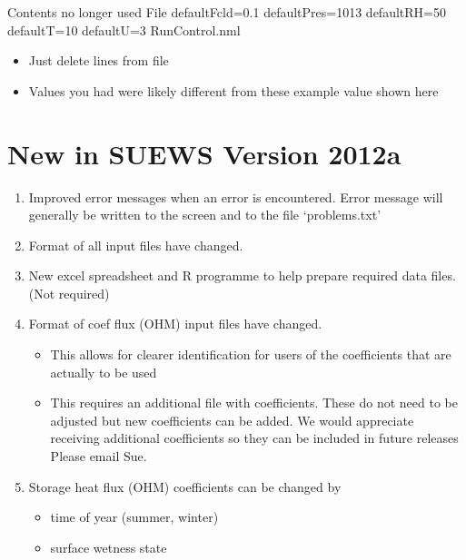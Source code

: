 \documentclass[letterpaper,10pt,english]{sphinxmanual}
\begin{document}
Contents no longer used File defaultFcld=0.1 defaultPres=1013
defaultRH=50 defaultT=10 defaultU=3 RunControl.nml
\begin{itemize}
\item {} 
Just delete lines from file

\item {} 
Values you had were likely different from these example value shown
here

\end{itemize}


\section{New in SUEWS Version 2012a}
\label{\detokenize{version-history:new-in-suews-version-2012a}}\begin{enumerate}
\item {} 
Improved error messages when an error is encountered. Error message
will generally be written to the screen and to the file
‘problems.txt’

\item {} 
Format of all input files have changed.

\item {} 
New excel spreadsheet and R programme to help prepare required data
files. (Not required)

\item {} 
Format of coef flux (OHM) input files have changed.
\begin{itemize}
\item {} 
This allows for clearer identification for users of the
coefficients that are actually to be used

\item {} 
This requires an additional file with coefficients. These do not
need to be adjusted but new coefficients can be added. We would
appreciate receiving additional coefficients so they can be
included in future releases \textendash{} Please email Sue.

\end{itemize}

\item {} 
Storage heat flux (OHM) coefficients can be changed by
\begin{itemize}
\item {} 
time of year (summer, winter)

\item {} 
surface wetness state

\end{itemize}


\end{enumerate}
\end{document}
